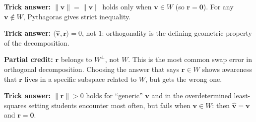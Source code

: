 \documentclass[12pt]{amsart}
\begin{document}
\textbf{Trick answer:}
$\|\hat{\mathbf{v}}\| = \|\mathbf{v}\|$ holds only when $\mathbf{v}\in W$ (so $\mathbf{r} = \mathbf{0}$).
For any $\mathbf{v}\notin W$, Pythagoras gives strict inequality.

\textbf{Trick answer:}
$\langle\hat{\mathbf{v}},\mathbf{r}\rangle = 0$, not $1$: orthogonality is the
defining geometric property of the decomposition.

\textbf{Partial credit:}
$\mathbf{r}$ belongs to $W^\perp$, not $W$.
This is the most common swap error in orthogonal decomposition.
Choosing the answer that says $\mathbf{r}\in W$ shows awareness that $\mathbf{r}$ lives
in a specific subspace related to $W$, but gets the wrong one.

\textbf{Trick answer:}
$\|\mathbf{r}\| > 0$ holds for ``generic'' $\mathbf{v}$ and in the overdetermined
least-squares setting students encounter most often, but fails when $\mathbf{v}\in W$:
then $\hat{\mathbf{v}} = \mathbf{v}$ and $\mathbf{r} = \mathbf{0}$.
\end{document}
